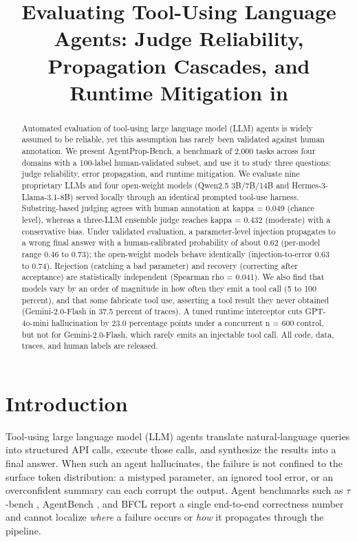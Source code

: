 \documentclass{article}
\title{Evaluating Tool-Using Language Agents: Judge Reliability,\\
Propagation Cascades, and Runtime Mitigation in \bench{}}
\author{}
\begin{document}
\maketitle

\begin{abstract}
Automated evaluation of tool-using large language model (LLM) agents is widely
assumed to be reliable, yet this assumption has rarely been validated against
human annotation. We present AgentProp-Bench, a benchmark of 2,000 tasks across
four domains with a 100-label human-validated subset, and use it to study three
questions: judge reliability, error propagation, and runtime mitigation. We
evaluate nine proprietary LLMs and four open-weight models (Qwen2.5 3B/7B/14B
and Hermes-3-Llama-3.1-8B) served locally through an identical prompted tool-use
harness.
Substring-based judging agrees with human annotation at kappa = 0.049
(chance level), whereas a three-LLM ensemble judge reaches kappa = 0.432
(moderate) with a conservative bias. Under validated evaluation, a
parameter-level injection propagates to a wrong final answer with a
human-calibrated probability of about 0.62 (per-model range 0.46 to 0.73); the
open-weight models behave identically (injection-to-error 0.63 to 0.74).
Rejection (catching a bad parameter) and recovery (correcting after acceptance)
are statistically independent (Spearman rho = 0.041). We also find that models
vary by an order of magnitude in how often they emit a tool call (5 to 100
percent), and that some fabricate tool use, asserting a tool result they never
obtained (Gemini-2.0-Flash in 37.5 percent of traces). A tuned runtime
interceptor cuts GPT-4o-mini hallucination by 23.0 percentage points under a
concurrent n = 600 control, but not for Gemini-2.0-Flash, which rarely emits an
injectable tool call. All code, data, traces, and human labels are released.
\end{abstract}

\section{Introduction}
\label{sec:intro}

Tool-using large language model (LLM) agents translate natural-language
queries into structured API calls, execute those calls, and synthesize
the results into a final answer.
When such an agent hallucinates, the failure is not confined to the
surface token distribution: a mistyped parameter, an ignored tool error,
or an overconfident summary can each corrupt the output.
Agent benchmarks such as $\tau$-bench \citep{yao2024tau},
AgentBench \citep{liu2024agentbench}, and BFCL \citep{yan2025bfcl}
report a single end-to-end correctness number and cannot localize
\emph{where} a failure occurs or \emph{how} it propagates through the
pipeline.
\end{document}
